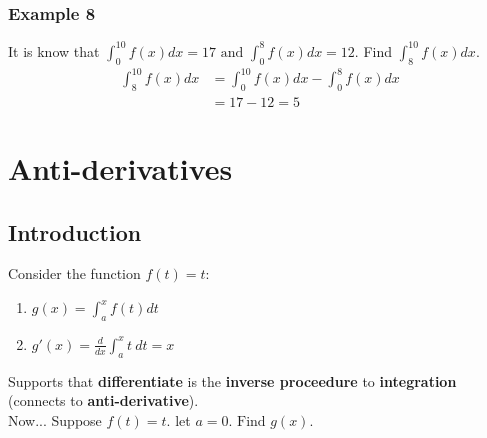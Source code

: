 \documentclass[11pt]{article}
\begin{document}
\subsubsection{Example 8}
It is know that $\displaystyle{\int_{0}^{10}f(x)dx=17 \text{ and }\int_{0}^{8}f(x)dx=12}$. Find $\displaystyle{\int_{8}^{10}f(x)dx}$.
\begin{align*}
    \int_{8}^{10}f(x)dx &= \int_{0}^{10}f(x)dx - \int_{0}^{8}f(x)dx\\
    &= 17-12 = 5
\end{align*}

\section{Anti-derivatives}
\subsection{Introduction}
Consider the function $f(t)=t$:
\begin{enumerate}
    \item $ \displaystyle{g(x)=\int_{a}^{x}f(t)dt} $
    \item $ \displaystyle{g'(x) = \frac{d}{dx}\int_{a}^{x}t\ dt=x} $
\end{enumerate}
Supports that \textbf{differentiate} is the \textbf{inverse proceedure} to \textbf{integration} (connects to \textbf{anti-derivative}).
\\[10pt]
\noindent
Now... Suppose $f(t)=t$. let $a=0 \text{. Find }g(x)$.
\end{document}
